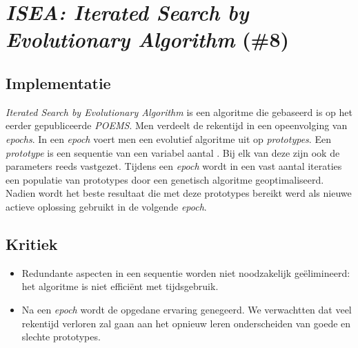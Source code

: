 \section{\emph{ISEA: Iterated Search by Evolutionary Algorithm} (\#8)}

\subsection{Implementatie}
\emph{Iterated Search by Evolutionary Algorithm}\cite{chesc-isea} is een algoritme die gebaseerd is op het eerder gepubliceerde \emph{POEMS}\cite{eurogp06:KubalikFaigl}. Men verdeelt de rekentijd in een opeenvolging van \emph{epochs}. In een \emph{epoch} voert men een evolutief algoritme uit op \emph{prototypes}. Een \emph{prototype} is een sequentie van een variabel aantal \abhn{}. Bij elk van deze \abhn{} zijn ook de parameters reeds vastgezet. Tijdens een \emph{epoch} wordt in een vast aantal iteraties een populatie van prototypes door een genetisch algoritme geoptimaliseerd. Nadien wordt het beste resultaat die met deze prototypes bereikt werd als nieuwe actieve oplossing gebruikt in de volgende \emph{epoch}. 

\subsection{Kritiek}
\begin{itemize}
 \item Redundante aspecten in een sequentie worden niet noodzakelijk ge\"elimineerd: het algoritme is niet effici\"ent met tijdsgebruik.
 \item Na een \emph{epoch} wordt de opgedane ervaring genegeerd. We verwachtten dat veel rekentijd verloren zal gaan aan het opnieuw leren onderscheiden van goede en slechte prototypes.
\end{itemize}